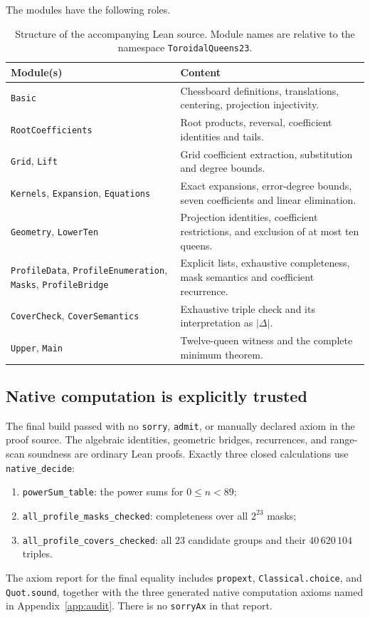 \documentclass[11pt,a4paper]{article}
\theoremstyle{remark}
\newcommand{\card}[1]{\lvert#1\rvert}
\begin{document}
The modules have the following roles.
\begin{table}[ht]
\centering\small
\begin{tabular}{>{\raggedright\arraybackslash}p{.33\linewidth}>{\raggedright\arraybackslash}p{.59\linewidth}}
\toprule
Module(s) & Content\\
\midrule
\texttt{Basic} & Chessboard definitions, translations, centering, projection injectivity.\\
\texttt{RootCoefficients} & Root products, reversal, coefficient identities and tails.\\
\texttt{Grid}, \texttt{Lift} & Grid coefficient extraction, substitution and degree bounds.\\
\texttt{Kernels}, \texttt{Expansion}, \texttt{Equations} & Exact expansions, error-degree bounds, seven coefficients and linear elimination.\\
\texttt{Geometry}, \texttt{LowerTen} & Projection identities, coefficient restrictions, and exclusion of at most ten queens.\\
\texttt{ProfileData}, \texttt{ProfileEnumeration}, \texttt{Masks}, \texttt{ProfileBridge} & Explicit lists, exhaustive completeness, mask semantics and coefficient recurrence.\\
\texttt{CoverCheck}, \texttt{CoverSemantics} & Exhaustive triple check and its interpretation as $\card\Delta$.\\
\texttt{Upper}, \texttt{Main} & Twelve-queen witness and the complete minimum theorem.\\
\bottomrule
\end{tabular}
\caption{Structure of the accompanying Lean source. Module names are relative
to the namespace \texttt{ToroidalQueens23}.}
\end{table}

\subsection{Native computation is explicitly trusted}
The final build passed with no \texttt{sorry}, \texttt{admit}, or manually
declared axiom in the proof source. The algebraic identities, geometric
bridges, recurrences, and range-scan soundness are ordinary Lean proofs.
Exactly three closed calculations use \texttt{native\_decide}:
\begin{enumerate}
\item \texttt{powerSum\_table}: the power sums for $0\leq n<89$;
\item \texttt{all\_profile\_masks\_checked}: completeness over all $2^{23}$ masks;
\item \texttt{all\_profile\_covers\_checked}: all $23$ candidate groups and their
$40\,620\,104$ triples.
\end{enumerate}
The axiom report for the final equality includes \texttt{propext},
\texttt{Classical.choice}, and \texttt{Quot.sound}, together with the three
generated native computation axioms named in Appendix~\ref{app:audit}.
There is no \texttt{sorryAx} in that report.
\end{document}
